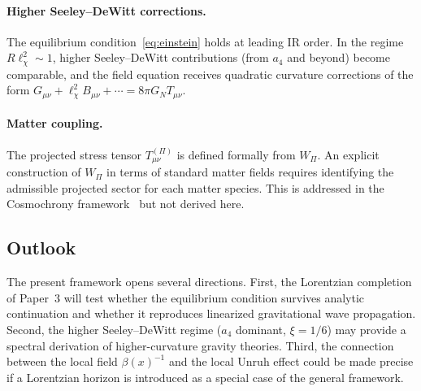     \paragraph{Higher Seeley--DeWitt corrections.}
      The equilibrium condition~\eqref{eq:einstein} holds at leading IR order.
      In the regime $R\ell_\chi^2 \sim 1$, higher Seeley--DeWitt contributions (from $a_4$
      and beyond) become comparable, and the field equation receives quadratic curvature
      corrections of the form $G_{\mu\nu} + \ell_\chi^2 B_{\mu\nu} + \cdots =
8\pi G_N T_{\mu\nu}$.

    \paragraph{Matter coupling.}
      The projected stress tensor $T^{(\Pi)}_{\mu\nu}$ is defined formally from $W_\Pi$.
      An explicit construction of $W_\Pi$ in terms of standard matter fields requires
      identifying the admissible projected sector for each matter species.
      This is addressed in the Cosmochrony framework~\cite{Cosmochrony} but not derived
      here.

\subsection{Outlook}
  \label{subsec:outlook}

  The present framework opens several directions.
  First, the Lorentzian completion of Paper~3 will test whether the equilibrium
  condition survives analytic continuation and whether it reproduces linearized
  gravitational wave propagation.
  Second, the higher Seeley--DeWitt regime ($a_4$ dominant, $\xi = 1/6$) may
  provide a spectral derivation of higher-curvature gravity theories.
  Third, the connection between the local field $\beta(x)^{-1}$ and the local
  Unruh effect could be made precise if a Lorentzian horizon is introduced as a
  special case of the general framework.
